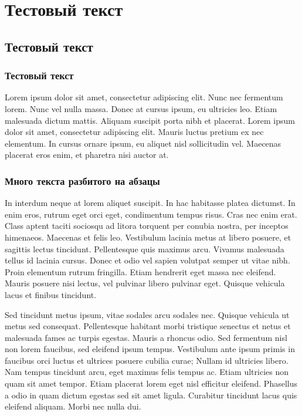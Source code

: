 \chapter{Тестовый текст}
\section{Тестовый текст}
\subsection{Тестовый текст}

Lorem ipsum dolor sit amet, consectetur adipiscing elit. Nunc nec fermentum lorem. Nunc vel nulla massa. Donec at cursus ipsum, eu ultricies leo. Etiam malesuada dictum mattis. Aliquam suscipit porta nibh et placerat. Lorem ipsum dolor sit amet, consectetur adipiscing elit. Mauris luctus pretium ex nec elementum. In cursus ornare ipsum, eu aliquet nisl sollicitudin vel. Maecenas placerat eros enim, et pharetra nisi auctor at.

\subsection{Много текста разбитого на абзацы}\label{subsec:chapter_2/section_1/subsection_3}

In interdum neque at lorem aliquet suscipit. In hac habitasse platea dictumst. In enim eros, rutrum eget orci eget, condimentum tempus risus. Cras nec enim erat. Class aptent taciti sociosqu ad litora torquent per conubia nostra, per inceptos himenaeos. Maecenas et felis leo. Vestibulum lacinia metus at libero posuere, et sagittis lectus tincidunt. Pellentesque quis maximus arcu. Vivamus malesuada tellus id lacinia cursus. Donec et odio vel sapien volutpat semper ut vitae nibh. Proin elementum rutrum fringilla. Etiam hendrerit eget massa nec eleifend. Mauris posuere nisi lectus, vel pulvinar libero pulvinar eget. Quisque vehicula lacus et finibus tincidunt.

Sed tincidunt metus ipsum, vitae sodales arcu sodales nec. Quisque vehicula ut metus sed consequat. Pellentesque habitant morbi tristique senectus et netus et malesuada fames ac turpis egestas. Mauris a rhoncus odio. Sed fermentum nisl non lorem faucibus, sed eleifend ipsum tempus. Vestibulum ante ipsum primis in faucibus orci luctus et ultrices posuere cubilia curae; Nullam id ultricies libero. Nam tempus tincidunt arcu, eget maximus felis tempus ac. Etiam ultricies non quam sit amet tempor. Etiam placerat lorem eget nisl efficitur eleifend. Phasellus a odio in quam dictum egestas sed sit amet ligula. Curabitur tincidunt lacus quis eleifend aliquam. Morbi nec nulla dui.

